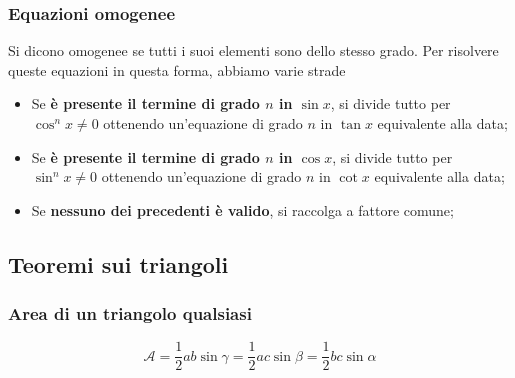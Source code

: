 \subsubsection{Equazioni omogenee}
Si dicono omogenee se tutti i suoi elementi sono dello stesso grado. Per risolvere queste equazioni
in questa forma, abbiamo varie strade
\begin{itemize}
  \item Se \textbf{è presente il termine di grado $n$ in $\sin x$}, si divide tutto per 
    $\cos^nx\neq0$ ottenendo un'equazione di grado $n$ in $\tan x$ equivalente alla data;
  \item Se \textbf{è presente il termine di grado $n$ in $\cos x$}, si divide tutto per
    $\sin^nx\neq0$ ottenendo un'equazione di grado $n$ in $\cot x$ equivalente alla data;
  \item Se \textbf{nessuno dei precedenti è valido}, si raccolga a fattore comune;
\end{itemize}

\subsection{Teoremi sui triangoli}
\subsubsection{Area di un triangolo qualsiasi}
\begin{center}
\end{center}
\begin{equation*}
  \mathscr{A} = \frac{1}{2}ab\sin\gamma = \frac{1}{2}ac\sin\beta = \frac{1}{2}bc\sin\alpha
\end{equation*}

